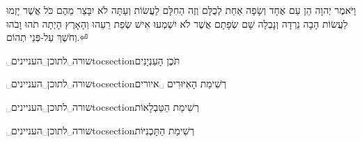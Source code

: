 \maketitle


\hfill

\begin{minipage}[l]{0.34688\textwidth}
וַיֹּאמֶר יְהוָה הֵן עַם אֶחָד וְשָׂפָה אַחַת לְכֻלָּם וְזֶה הַחִלָּם
לַעֲשׂוֹת וְעַתָּה לֹא יִבָּצֵר מֵהֶם כֹּל אֲשֶׁר יָזְמוּ לַעֲשׂוֹת
הָבָה נֵרְדָה וְנָבְלָה שָׁם שְׂפָתָם אֲשֶׁר לֹא יִשְׁמְעוּ אִישׁ שְׂפַת
רֵעֵהוּ וְהָאָרֶץ הָיְתָה תֹהוּ וָבֹהוּ וְחֹשֶׁךְ עַל-פְּנֵי תְהוֹם.⏎
\end{minipage}



\renewcommand\contentsname{תוכן הענינים}
\renewcommand\listfigurename{רְשִׁימַת הָאִיּוּרִים}
\renewcommand\listtablename{רְשִׁימַת הַטַּבְלָאוֹת}  

\cleardoublepage
{}␣שורה␣לתוכן␣העניינים{toc}{section}{תֹּכֶן הָעִנְיָנִים}
\tableofcontents

\cleardoublepage
{}␣שורה␣לתוכן␣העניינים{toc}{section}{רְשִׁימַת הָאִיּוּרִים}
␣איורים

\cleardoublepage
{}␣שורה␣לתוכן␣העניינים{toc}{section}{רְשִׁימַת הַטַּבְלָאוֹת}
\listoftables

\cleardoublepage
{}␣שורה␣לתוכן␣העניינים{toc}{section}{רְשִׁימַת הַתָּכְנִיּוֹת}



